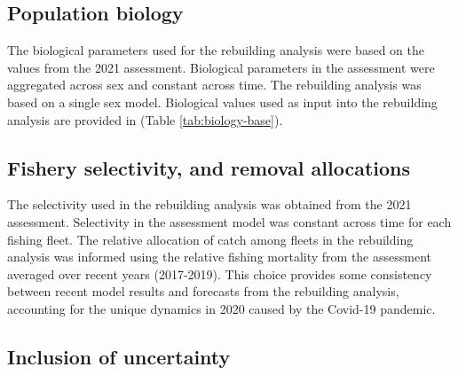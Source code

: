 \documentclass[11pt,
  english,
  a4paper,
]{article}
\begin{document}
\leavevmode\tagmcend\tagstructend\par


\hypertarget{population-biology}{%
\subsection{Population biology}\label{population-biology}}

\leavevmode\tagmcend\tagstructend


The biological parameters used for the rebuilding analysis were based on the values from the 2021 assessment. Biological parameters in the assessment were aggregated across sex and constant across time. The rebuilding analysis was based on a single sex model. Biological values used as input into the rebuilding analysis are provided in (Table \ref{tab:biology-base}).

\leavevmode\tagmcend\tagstructend\par


\hypertarget{fishery-selectivity-and-removal-allocations}{%
\subsection{Fishery selectivity, and removal allocations}\label{fishery-selectivity-and-removal-allocations}}

\leavevmode\tagmcend\tagstructend


The selectivity used in the rebuilding analysis was obtained from the 2021 assessment. Selectivity in the assessment model was constant across time for each fishing fleet. The relative allocation of catch among fleets in the rebuilding analysis was informed using the relative fishing mortality from the assessment averaged over recent years (2017-2019). This choice provides some consistency between recent model results and forecasts from the rebuilding analysis, accounting for the unique dynamics in 2020 caused by the Covid-19 pandemic.

\leavevmode\tagmcend\tagstructend\par


\hypertarget{inclusion-of-uncertainty}{%
\subsection{Inclusion of uncertainty}\label{inclusion-of-uncertainty}}
\end{document}
